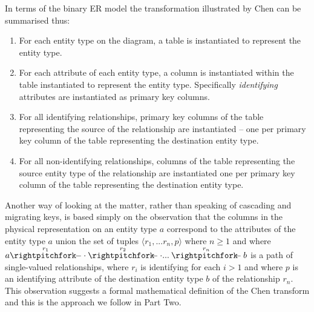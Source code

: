 In terms of the binary ER model the transformation illustrated by Chen can be summarised thus:
\begin{enumerate} [I]
	\item For each entity type on the diagram, a table is instantiated to represent the entity type.
  \item For each attribute of each entity type, a column is instantiated within the table
	      instantiated to represent the entity type. Specifically \textit{identifying}
				attributes are instantiated as primary key columns.
  \item For all identifying relationships,
	      primary key columns of the table representing the source of the relationship
				are instantiated --
				one per primary key column of the table representing the destination entity type.
  \item For all non-identifying relationships, columns of the table representing the
	      source entity type of the
	      relationship are instantiated one per primary key column of the 
				table representing the destination entity type.
\end{enumerate}

Another way of looking at the matter, rather than speaking of cascading and migrating keys, is based simply on the observation that the columns in the physical representation on an entity type $a$ correspond to the attributes of the entity type $a$ union the set of tuples $\langle r_1,...r_n, p \rangle$ where $n \geq 1$ and where
$\overset{r_1}{a \rightpitchfork \hspace{-0.35em} -  \cdot} \overset{r_2}{\rightpitchfork \hspace{-0.35em} -} \cdot ... \overset{r_n}{\rightpitchfork \hspace{-0.35em} -} b$ is a path of single-valued relationships, where 
$r_i$ is identifying for each $i > 1$ and where $p$ is an identifying attribute of the destination entity type $b$ of the
relationship $r_n$. This observation suggests a formal mathematical definition of the Chen transform and this is the approach we follow in Part Two. \\


